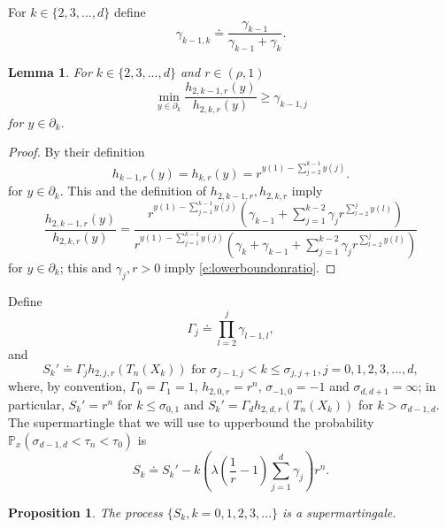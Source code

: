 \documentclass[11pt,a4paper]{article}
\newtheorem{lemma}{Lemma}
\newtheorem{proposition}{Proposition}[section]
\begin{document}
For $k \in \{2,3,...,d\}$ define
\[
\gamma_{k-1,k} \doteq \frac{\gamma_{k-1}}{\gamma_{k-1} + \gamma_{k}}.
\]
\begin{lemma}\label{l:inequalityoverjumps}
For $k \in \{2,3,...,d\}$  and $r \in (\rho,1)$
\begin{equation}\label{e:lowerboundonratio}
\min_{y \in \partial_{k}} \frac{h_{2,k-1,r}(y)}{h_{2,k,r}(y)} \ge 
\gamma_{k-1,j}
\end{equation}
for $y \in \partial_{k}.$
\end{lemma}
\begin{proof}
By their definition
\[
h_{k-1,r}(y) = h_{k,r}(y)  = r^{y(1)- \sum_{j=2}^{k-1} y(j)}.
\]
for $y \in \partial_{k}.$
This and the definition of $h_{2,k-1,r}, h_{2,k,r}$ imply
\[
\frac{h_{2,k-1,r}(y)}{h_{2,k,r}(y)} 
=
\frac{
r^{y(1)- \sum_{j=1}^{k-1} y(j)} \left( \gamma_{k-1} + \sum_{j=1}^{k -2}
 \gamma_j r^{\sum_{l=2}^j y(l)} \right)}
{r^{y(1)- \sum_{j=1}^{k-1} y(j)} \left( \gamma_{k} +\gamma_{k-1}+ 
\sum_{j=1}^{k -2}
 \gamma_j r^{\sum_{l=2}^j y(l)} \right)}
\]
for $y \in \partial_{k}$;
this and $\gamma_j, r > 0$ imply
\eqref{e:lowerboundonratio}.
\end{proof}
Define
\[
\Gamma_j \doteq \prod_{l=2}^{j} \gamma_{l-1,l},
\]
and
\[
S_k' \doteq 
\Gamma_j h_{2,j,r}(T_n(X_k)) \text{ for }\sigma_{j-1,j} < k \le \sigma_{j,j+1}, 
j=0,1,2,3,...,d,
\]
where, by convention, $\Gamma_{0} = \Gamma_1 = 1$, $h_{2,0,r} = r^n$,
 $\sigma_{-1,0} = -1$ and $\sigma_{d,d+1} = \infty$; in particular,
$S_k' = r^n$ for $k \le \sigma_{0,1}$ and $S_k' = \Gamma_d h_{2,d,r}(T_n(X_k))$
for $k > \sigma_{d-1,d}.$
The supermartingle that we will use to upperbound the probability
${\mathbb P}_{x}(\sigma_{d-1,d} < \tau_n < \tau_0)$
is
\begin{equation}\label{e:defsupS}
S_k \doteq S_k' - 
k\left( \lambda \left(\frac{1}{r} -1\right) \sum_{j=1}^d \gamma_j \right) r^n.
\end{equation}
\begin{proposition}
The process $\{S_k, k=0,1,2,3,...\}$ is a supermartingale.
\end{proposition}
\end{document}
